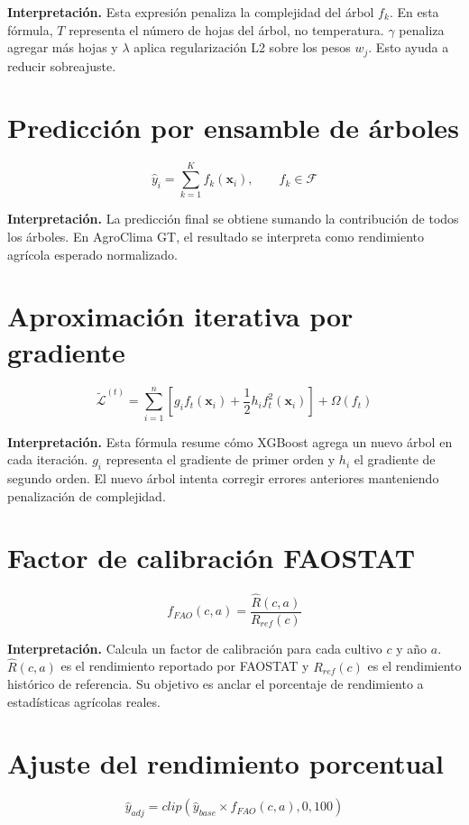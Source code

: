 \documentclass[12pt,letterpaper,oneside]{report}
\begin{document}
\textbf{Interpretación.} Esta expresión penaliza la complejidad del árbol $f_k$. En esta fórmula, $T$ representa el número de hojas del árbol, no temperatura. $\gamma$ penaliza agregar más hojas y $\lambda$ aplica regularización L2 sobre los pesos $w_j$. Esto ayuda a reducir sobreajuste.

\section{Predicción por ensamble de árboles}
\begin{equation}
\hat{y}_i=\sum_{k=1}^{K}f_k(\mathbf{x}_i), \qquad f_k \in \mathcal{F}
\end{equation}

\textbf{Interpretación.} La predicción final se obtiene sumando la contribución de todos los árboles. En AgroClima GT, el resultado se interpreta como rendimiento agrícola esperado normalizado.

\section{Aproximación iterativa por gradiente}
\begin{equation}
\tilde{\mathcal{L}}^{(t)}=\sum_{i=1}^{n}\left[g_if_t(\mathbf{x}_i)+\frac{1}{2}h_if_t^2(\mathbf{x}_i)\right]+\Omega(f_t)
\end{equation}

\textbf{Interpretación.} Esta fórmula resume cómo XGBoost agrega un nuevo árbol en cada iteración. $g_i$ representa el gradiente de primer orden y $h_i$ el gradiente de segundo orden. El nuevo árbol intenta corregir errores anteriores manteniendo penalización de complejidad.

\section{Factor de calibración FAOSTAT}
\begin{equation}
f_{FAO}(c,a)=\frac{\hat{R}(c,a)}{R_{ref}(c)}
\end{equation}

\textbf{Interpretación.} Calcula un factor de calibración para cada cultivo $c$ y año $a$. $\hat{R}(c,a)$ es el rendimiento reportado por FAOSTAT y $R_{ref}(c)$ es el rendimiento histórico de referencia. Su objetivo es anclar el porcentaje de rendimiento a estadísticas agrícolas reales.

\section{Ajuste del rendimiento porcentual}
\begin{equation}
\hat{y}_{adj}=clip(\hat{y}_{base}\times f_{FAO}(c,a),0,100)
\end{equation}
\end{document}

